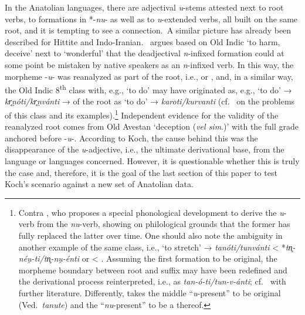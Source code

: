 \documentclass[output=paper,colorlinks,citecolor=brown]{langscibook}
\begin{document}
\largerpage
In the Anatolian languages, there are adjectival \textit{u}-stems attested next to root verbs, to formations in *-\textit{nu}- as well as to \textit{u}-extended verbs, all built on the same root, and it is tempting to see a connection.\ A similar picture has already been described for Hittite and Indo-Iranian.\ \citet[235]{Koch1980} argues based on Old Indic  ‘to harm, deceive’ next to  ‘wonderful’ that the deadjectival  \textit{n}-infixed formation could at some point be mistaken by native speakers as an \textit{n}-infixed verb. In this way, the morpheme -\textit{u}- was reanalyzed as part of the root, i.e.,  or , and, in a similar way, the Old Indic 8\textsuperscript{th} class with, e.g.,  ‘to do’ may have originated as, e.g.,   ‘to do’ → \textit{kr̥ṇóti/kr̥ṇvánti} →  of the root as  ‘to do’ → \textit{karoti/kurvanti} (cf.\ \citealt[265--268]{ThumbHauschild1959} on the problems of this class and its examples).\footnote{Contra \citet{Hoffmann1976karoti}, who proposes a special phonological development to derive the \textit{u}-verb from the \textit{nu}-verb, showing on philological grounds that the former has fully replaced the latter over time. One should also note the ambiguity in another example of the same class, i.e.,  ‘to stretch’ → \textit{tanóti/tunvánti} < *\textit{tn̥-néu̯-ti/tn̥-nu̯-énti} or < . Assuming the first formation to be original, the morpheme boundary between root and suffix may have been redefined and the derivational process reinterpreted, i.e., as \textit{tan-ó-ti/tun-v-ánti}; cf.\ \citealt[265]{ThumbHauschild1959} with further literature. Differently, \citet[63]{Jasanoff2023} takes the middle “\textit{u}-present”  to be original (Ved.\ \textit{tanute}) and the “\textit{nu}-present”  to be a  thereof.} Independent evidence for the validity of the reanalyzed root  comes from Old Avestan  ‘deception (\textit{vel sim}.)’ with the full grade anchored before -\textit{u}-. According to Koch, the cause behind this  was the disappearance of the \textit{u}-adjective, i.e., the ultimate derivational base, from the language or languages concerned. However, it is questionable whether this is truly the case and, therefore, it is the goal of the last section of this paper to test Koch’s scenario against a new set of Anatolian data.
\end{document}
